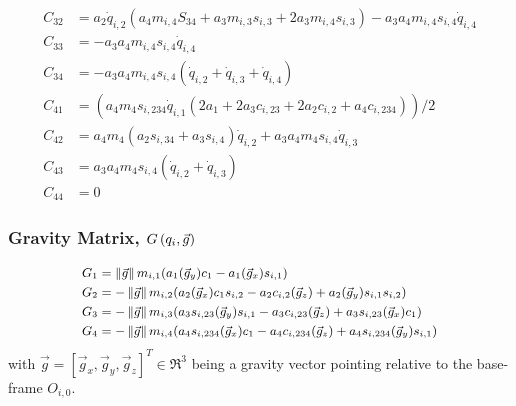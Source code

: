 \begin{equation*}
\begin{split}
	    C_{32} 	& = a_{2} \dot{q}_{i,2} (a_{4} m_{i,4} S_{34} + a_{3} m_{i,3} s_{i,3} + 2 a_{3} m_{i,4} s_{i,3}) - a_{3} a_{4} m_{i,4} s_{i,4} \dot{q}_{i,4}\\
	   	C_{33} 	& =  -a_{3} a_{4} m_{i,4} s_{i,4} \dot{q}_{i,4}\\
	    C_{34} 	& = -a_{3} a_{4} m_{i,4} s_{i,4} (\dot{q}_{i,2} + \dot{q}_{i,3} + \dot{q}_{i,4})\\
	    C_{41} 	& = (a_{4} m_{4} s_{i,234} \dot{q}_{i,1} (2 a_{1} + 2 a_{3} c_{i,23} + 2 a_{2} c_{i,2} + a_{4} c_{i,234}))/2\\
	    C_{42} 	& = a_{4} m_{4} (a_{2} s_{i,34} + a_{3} s_{i,4}) \dot{q}_{i,2} + a_{3} a_{4} m_{4} s_{i,4} \dot{q}_{i,3}\\
	    C_{43} 	& = a_{3} a_{4} m_{4} s_{i,4} (\dot{q}_{i,2} + \dot{q}_{i,3})\\
	    C_{44} 	& = 0
		\end{split}
	\end{equation*}

	\subsubsection{Gravity Matrix, $G\left(q_{i},\vec{g}\right)$}
	\label{sec::gravity_matrix}
	\vspace{-5mm}
	\begin{equation*}\small
		\begin{split}
		G_{1}  &=  \left\lVert\vec{g}\right\rVert m_{i,1} (a_{1} (\vec{g}_{y}) c_{1} - a_{1} (\vec{g}_{x}) s_{i,1}) \\
		G_{2}  &= -\left\lVert\vec{g}\right\rVert m_{i,2} (a_{2} (\vec{g}_{x}) c_{1} s_{i,2} - a_{2} c_{i,2} (\vec{g}_{z}) + a_{2} (\vec{g}_{y}) s_{i,1} s_{i,2}) \\
		G_{3}  &= -\left\lVert\vec{g}\right\rVert m_{i,3} (a_{3} s_{i,23} (\vec{g}_{y}) s_{i,1} - a_{3} c_{i,23} (\vec{g}_{z}) + a_{3} s_{i,23} (\vec{g}_{x}) c_{1}) \\
		G_{4}  &= -\left\lVert\vec{g}\right\rVert m_{i,4} (a_{4} s_{i,234} (\vec{g}_{x}) c_{1} - a_{4} c_{i,234} (\vec{g}_{z}) + a_{4} s_{i,234} (\vec{g}_{y}) s_{i,1})
		\end{split}
	\end{equation*}
	with $\vec{g} = [\vec{g}_{x},\vec{g}_{y},\vec{g}_{z}]^{T} \in \Re^{3}$ being a gravity vector pointing relative to the base-frame $O_{i,0}$.

